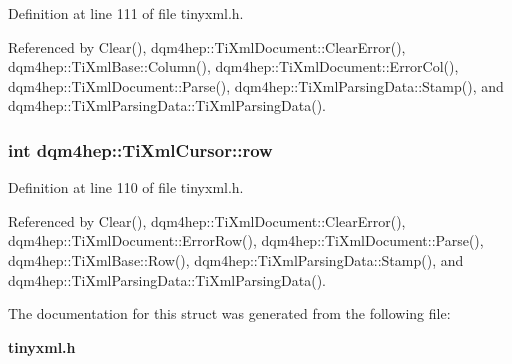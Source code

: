 Definition at line 111 of file tinyxml.\+h.



Referenced by Clear(), dqm4hep\+::\+Ti\+Xml\+Document\+::\+Clear\+Error(), dqm4hep\+::\+Ti\+Xml\+Base\+::\+Column(), dqm4hep\+::\+Ti\+Xml\+Document\+::\+Error\+Col(), dqm4hep\+::\+Ti\+Xml\+Document\+::\+Parse(), dqm4hep\+::\+Ti\+Xml\+Parsing\+Data\+::\+Stamp(), and dqm4hep\+::\+Ti\+Xml\+Parsing\+Data\+::\+Ti\+Xml\+Parsing\+Data().

\subsubsection[{row}]{\setlength{\rightskip}{0pt plus 5cm}int dqm4hep\+::\+Ti\+Xml\+Cursor\+::row}\label{structdqm4hep_1_1TiXmlCursor_aa3c9275afe68f45823115fd6ee41b454}


Definition at line 110 of file tinyxml.\+h.



Referenced by Clear(), dqm4hep\+::\+Ti\+Xml\+Document\+::\+Clear\+Error(), dqm4hep\+::\+Ti\+Xml\+Document\+::\+Error\+Row(), dqm4hep\+::\+Ti\+Xml\+Document\+::\+Parse(), dqm4hep\+::\+Ti\+Xml\+Base\+::\+Row(), dqm4hep\+::\+Ti\+Xml\+Parsing\+Data\+::\+Stamp(), and dqm4hep\+::\+Ti\+Xml\+Parsing\+Data\+::\+Ti\+Xml\+Parsing\+Data().



The documentation for this struct was generated from the following file\+:\begin{DoxyCompactItemize}
\item 
{\bf tinyxml.\+h}\end{DoxyCompactItemize}
